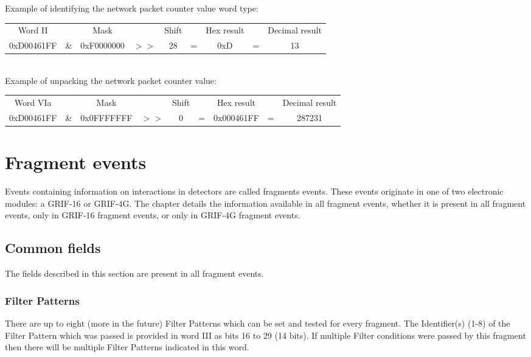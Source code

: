 \documentclass[letterpaper,12pt,notitlepage]{report}
\begin{document}
Example of identifying the network packet counter value word type:\\

\begin{tabular}{ccccccccc}
Word II &  & Mask & & Shift & & Hex result & & Decimal result\\
0xD00461FF & \& & 0xF0000000 & $>>$ & 28 & = & 0xD & = & 13\\
\end{tabular}\\

Example of unpacking the network packet counter value:\\

\begin{tabular}{ccccccccc}
Word VIa &  & Mask & & Shift & & Hex result & & Decimal result\\
0xD00461FF & \& & 0x0FFFFFFF & $>>$ & 0 & = & 0x000461FF & = & 287231\\
\end{tabular}


\chapter{Fragment events}

Events containing information on interactions in detectors are called fragments events. These events originate in one of two electronic modules: a GRIF-16 or GRIF-4G. The chapter details the information available in all fragment events, whether it is present in all fragment events, only in GRIF-16 fragment events, or only in GRIF-4G fragment events.

\section{Common fields}
The fields described in this section are present in all fragment events.

\subsection{Filter Patterns}
There are up to eight (more in the future) Filter Patterns which can be set and tested for every fragment. The Identifier(s) (1-8) of the Filter Pattern which was passed is provided in word III as bits 16 to 29 (14 bits). If multiple Filter conditions were passed by this fragment then there will be multiple Filter Patterns indicated in this word.\\
\end{document}
